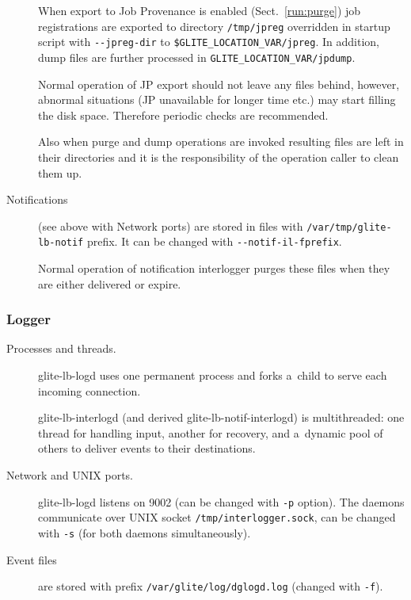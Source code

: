 \begin{description}
When export to Job Provenance is enabled (Sect.~\ref{run:purge})
job registrations are exported to directory \verb'/tmp/jpreg'
overridden in startup script with \verb'--jpreg-dir' to \verb'$GLITE_LOCATION_VAR/jpreg'.
In addition, dump files are further processed in \verb'GLITE_LOCATION_VAR/jpdump'.

Normal operation of JP export should not leave any files behind,
however, abnormal situations (JP unavailable for longer time etc.)
may start filling the disk space. Therefore periodic checks are
recommended.

Also when purge and dump operations are invoked resulting files are left in their
directories and it is the responsibility of the operation caller to clean them up.

\item[Notifications]
(see above with Network ports) are stored in files with \verb'/var/tmp/glite-lb-notif'
prefix. It can be changed with \verb'--notif-il-fprefix'.

Normal operation of notification interlogger purges these files when
they are either delivered or expire.

\end{description}

\subsubsection{Logger}

\begin{description}
\item[Processes and threads.]
glite-lb-logd uses one permanent process and forks a~child to serve
each incoming connection.

glite-lb-interlogd (and derived glite-lb-notif-interlogd) is multithreaded:
one thread for handling input, another for recovery, and a~dynamic pool of others
to deliver events to their destinations.

\item[Network and UNIX ports.]
glite-lb-logd listens on 9002 (can be changed with \verb'-p' option).
The daemons communicate over UNIX socket \verb'/tmp/interlogger.sock',
can be changed with \verb'-s' (for both daemons simultaneously).

\item[Event files] are stored
with prefix \verb'/var/glite/log/dglogd.log' (changed with \verb'-f').


\end{description}

